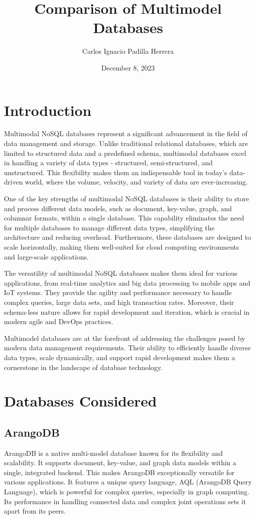 \documentclass[a3paper,11pt]{extarticle}
\title{Comparison of Multimodel Databases}
\author{Carlos Ignacio Padilla Herrera}
\date{December 8, 2023}
\begin{document}
\maketitle
\newpage

\section*{Introduction}

Multimodal NoSQL databases represent a significant advancement in the field of data management and storage. Unlike traditional relational databases, which are limited to structured data and a predefined schema, multimodal databases excel in handling a variety of data types - structured, semi-structured, and unstructured. This flexibility makes them an indispensable tool in today's data-driven world, where the volume, velocity, and variety of data are ever-increasing.

One of the key strengths of multimodal NoSQL databases is their ability to store and process different data models, such as document, key-value, graph, and columnar formats, within a single database. This capability eliminates the need for multiple databases to manage different data types, simplifying the architecture and reducing overhead. Furthermore, these databases are designed to scale horizontally, making them well-suited for cloud computing environments and large-scale applications.

The versatility of multimodal NoSQL databases makes them ideal for various applications, from real-time analytics and big data processing to mobile apps and IoT systems. They provide the agility and performance necessary to handle complex queries, large data sets, and high transaction rates. Moreover, their schema-less nature allows for rapid development and iteration, which is crucial in modern agile and DevOps practices.

Multimodel databases are at the forefront of addressing the challenges posed by modern data management requirements. Their ability to efficiently handle diverse data types, scale dynamically, and support rapid development makes them a cornerstone in the landscape of database technology.

\newpage

\section*{Databases Considered}

\subsection*{ArangoDB}
ArangoDB is a native multi-model database known for its flexibility and scalability. It supports document, key-value, and graph data models within a single, integrated backend. This makes ArangoDB exceptionally versatile for various applications. It features a unique query language, AQL (ArangoDB Query Language), which is powerful for complex queries, especially in graph computing. Its performance in handling connected data and complex joint operations sets it apart from its peers.
\end{document}
